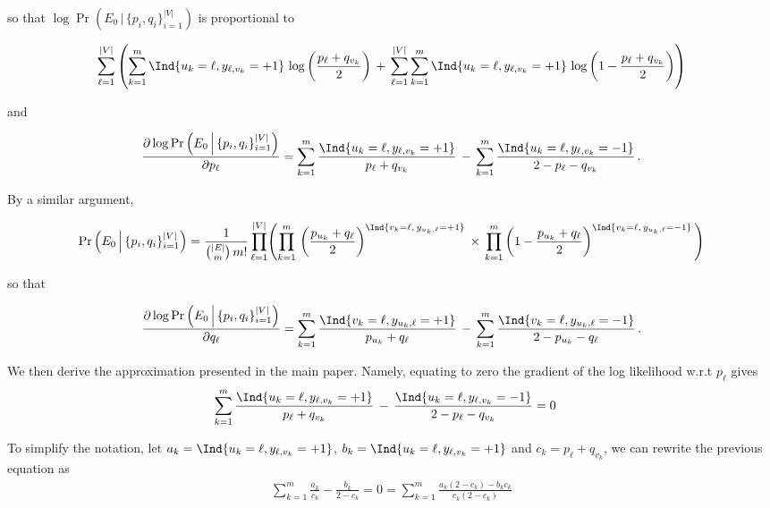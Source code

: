 so that $\log \Pr\left(E_0\,\Big|\, \{p_i, q_i\}_{i=1}^{|V|}\right)$ is proportional to

\begin{equation*}
  \sum_{\ell=1}^{|V|}\left(\sum_{k=1}^m \Ind{u_k = \ell,y_{\ell,v_k}=+1}\,
  \log\left(\frac{p_{\ell}+q_{v_k}}{2} \right)\, +\,
  \sum_{\ell=1}^{|V|}\sum_{k=1}^m \Ind{u_k = \ell,y_{\ell,v_k}=+1}\, 
\log\left(1-\frac{p_{\ell}+q_{v_k}}{2} \right)\right)
\end{equation*}

and

\begin{equation*}
  \frac{\partial \log \Pr\left(E_0\,\Big|\, \{p_i, q_i\}_{i=1}^{|V|}\right)}{\partial p_{\ell}}
  = \sum_{k=1}^m 
  \frac{\Ind{u_k = \ell,y_{\ell,v_k}=+1}}{p_{\ell}+q_{v_k}}\,
   - \,
  \sum_{k=1}^m \frac{\Ind{u_k = \ell,y_{\ell,v_k}=-1}}{2-p_{\ell}-q_{v_k}}\,.
\end{equation*}

By a similar argument,

\begin{align*}
  \Pr\left(E_0\,\Big|\, \{p_i, q_i\}_{i=1}^{|V|}\right) 
=
  \frac{1}{\binom{|E|}{m}\,m!}
  \prod_{\ell=1}^{|V|}\Biggl(\prod_{k=1}^m\,
    \left(\frac{p_{u_k}+q_{\ell}}{2} \right)^{\Ind{v_k = \ell,\,y_{u_k,\ell}=+1}}\,
\times\,
    \prod_{k=1}^m\left(1-\frac{p_{u_k}+q_{\ell}}{2} \right)^{\Ind{v_k = \ell,\,y_{u_k,\ell}=-1}}\Biggl)
\end{align*}

so that

\begin{align*}
\frac{\partial \log \Pr\left(E_0\,\Big|\, \{p_i, q_i\}_{i=1}^{|V|}\right)}{\partial q_{\ell}}
= \sum_{k=1}^m \frac{\Ind{v_k = \ell,y_{u_k,\ell}=+1}}{p_{u_k}+q_{\ell}}\,
- \, \sum_{k=1}^m \frac{\Ind{v_k = \ell,y_{u_k,\ell}=-1}}{2-p_{u_k}-q_{\ell}}\,.
\end{align*}

We then derive the approximation presented in the main paper. Namely, equating to zero the
gradient of the log likelihood w.r.t $p_\ell$ gives
\begin{align*}
\sum_{k=1}^m 
\frac{\Ind{u_k = \ell,y_{\ell,v_k}=+1}}{p_{\ell}+q_{v_k}}\,
 - \,
\frac{\Ind{u_k = \ell,y_{\ell,v_k}=-1}}{2-p_{\ell}-q_{v_k}} &= 0
\end{align*}

To simplify the notation, let $a_k = \Ind{u_k = \ell,y_{\ell,v_k}=+1}$, $b_k=\Ind{u_k =
\ell,y_{\ell,v_k}=+1}$ and $c_k = p_{\ell} + q_{v_k}$, we can rewrite the previous equation as 
\begin{align*}
  \sum_{k=1}^m \frac{a_k}{c_k} - \frac{b_k}{2-c_k} = 0 =
  \sum_{k=1}^m  \frac{a_k(2-c_k) - b_k c_k }{ c_k(2-c_k) }
\end{align*}

